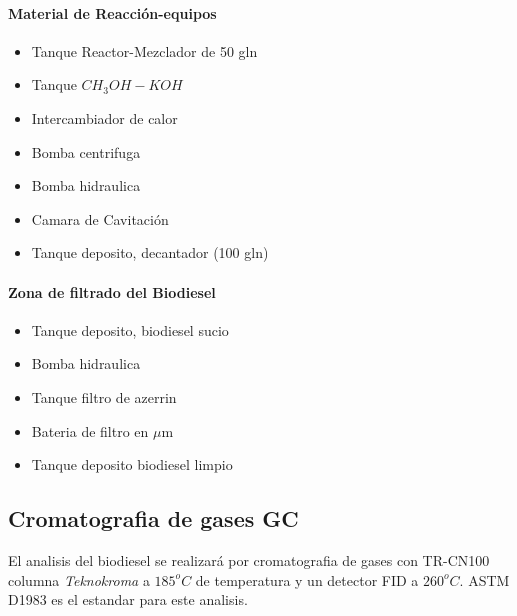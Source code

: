 \documentclass[a4paper,10pt]{article}
\begin{document}
\paragraph{Material de Reacción-equipos}
\begin{itemize}
 \item Tanque Reactor-Mezclador de 50 gln
 \item Tanque $CH_3 OH-KOH$
 \item Intercambiador de calor
 \item Bomba centrifuga
 \item Bomba hidraulica
 \item Camara de Cavitación
 \item Tanque deposito, decantador (100 gln)
\end{itemize}

\paragraph{Zona de filtrado del Biodiesel}
\begin{itemize}
 \item Tanque deposito, biodiesel sucio
 \item Bomba hidraulica
 \item Tanque filtro de azerrin
 \item Bateria de filtro en $\mu$m
 \item Tanque deposito biodiesel limpio
\end{itemize}

\subsection{Cromatografia de gases GC}
El  analisis del biodiesel se realizará por cromatografia de gases con TR-CN100 columna \emph{Teknokroma} 
a $185^o C$ de temperatura y un detector FID a $260^o C$. ASTM D1983  es el estandar para este analisis.



\end{document}
